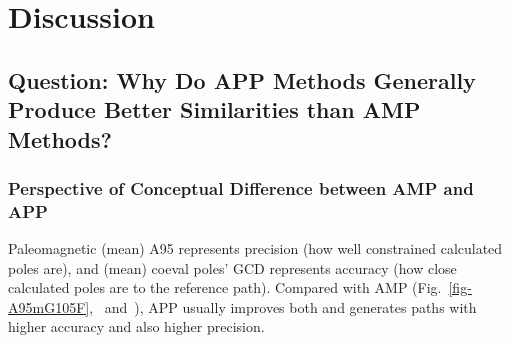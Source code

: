 \begin{landscape}
\begin{table}[tbp]
{\begin{tabular}{@{}clllllcccccccc@{}}
 &  &  &  &  &  &  &  &  &  &  &  &  &  \\ \bottomrule
\end{tabular}%
}
\end{table}
\end{landscape}

\section{Discussion}

\subsection{Question: Why Do APP Methods Generally Produce Better Similarities
than AMP Methods?}

\subsubsection{Perspective of Conceptual Difference between AMP and APP}

Paleomagnetic (mean) A95 represents precision (how well constrained calculated
poles are), and (mean) coeval poles' GCD represents accuracy (how close
calculated poles are to the reference path). Compared with AMP
(Fig.~\ref{fig-A95mG105F},~
and~), APP usually improves both and generates paths
with higher accuracy and also higher precision.


